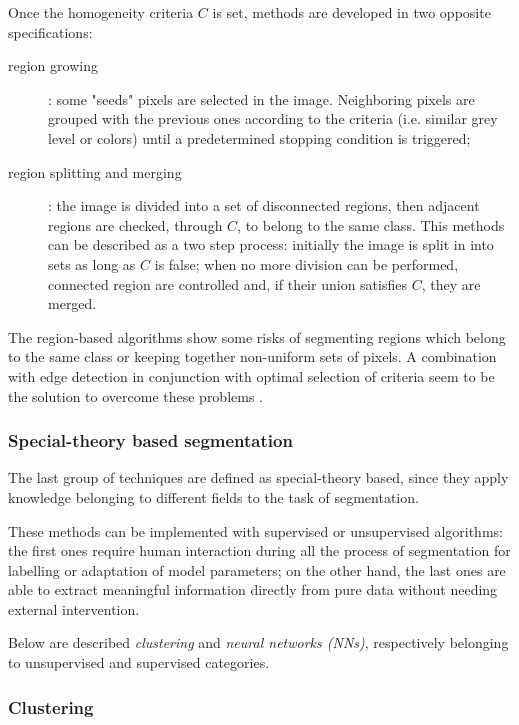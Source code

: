 \documentclass[../main.tex]{subfiles}
\begin{document}
Once the homogeneity criteria $C$ is set, methods are developed in two opposite specifications:
\begin{description}
\item[region growing] :  some "seeds" pixels are selected in the image. Neighboring pixels are grouped with the previous ones according to the criteria (i.e. similar grey level or colors) until a predetermined stopping condition is triggered;
\item[region splitting and merging] : the image is divided into a set of disconnected regions, then adjacent regions are checked, through $C$, to belong to the same class\cite{segmentation_review_1}. This methods can be described as a two step process: initially the image is split in  
into sets as long as $C$ is false; when no more division can be performed, connected region are controlled and, if their union satisfies $C$, they are merged. 
\end{description}

The region-based algorithms show some risks of segmenting regions which belong to the same class or keeping together non-uniform sets of pixels. A combination with edge detection in conjunction with optimal selection of criteria seem to be the solution to overcome these problems \cite{automated_segm_tech}.

\subsubsection{\large {Special-theory based segmentation}}

The last group of techniques are defined as special-theory based, since they apply knowledge belonging to different fields to the task of segmentation. 

These methods can be implemented with supervised or unsupervised algorithms: the first ones require human interaction during all the process of segmentation for labelling or adaptation of model parameters; on the other hand, the last ones are able to extract meaningful information directly from pure data without needing external intervention. 
 
Below are described \textit{clustering} and \textit{neural networks (NNs)}, respectively belonging to unsupervised and supervised categories.


\subsubsection{{Clustering}}
\end{document}

